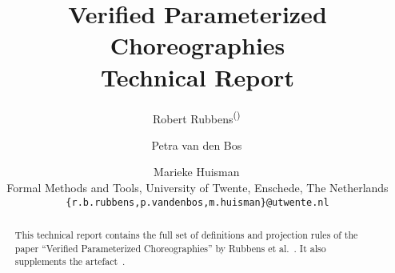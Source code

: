 \documentclass[dvipsnames]{article}
\title{Verified Parameterized Choreographies\\\Large{}Technical Report}
\author{
Robert Rubbens\textsuperscript{(\Letter)}\,\orcidlink{0000-0002-5638-5945} \and
Petra van den Bos\,\orcidlink{0000-0002-9212-1525} \and
Marieke Huisman\,\orcidlink{0000-0003-4467-072X} \\\small{} Formal Methods and Tools, University of Twente, Enschede, The Netherlands \\ \small{}
\texttt{\{r.b.rubbens,p.vandenbos,m.huisman\}@utwente.nl}
}
\date{}
\begin{document}
\maketitle

\begin{abstract}
This technical report contains the full set of definitions and projection rules of the paper ``Verified Parameterized Choreographies'' by Rubbens et al.~\cite{Rubbens2025}. It also supplements the artefact~\cite{Artefact}.
\end{abstract}

%





\newpage
\printbibliography
\end{document}
